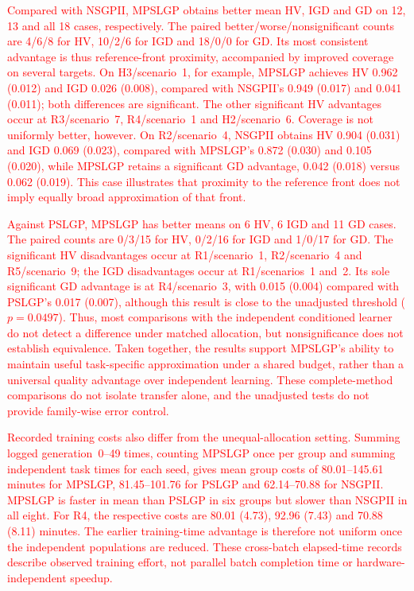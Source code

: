 \documentclass[10pt,journal]{IEEEtran}
\newcommand{\mm}[1]{\textcolor{red}{#1}}
\begin{document}
\mm{Compared with NSGPII, MPSLGP obtains better mean HV, IGD and GD on 12, 13 and all 18 cases, respectively. The paired better/worse/nonsignificant counts are 4/6/8 for HV, 10/2/6 for IGD and 18/0/0 for GD. Its most consistent advantage is thus reference-front proximity, accompanied by improved coverage on several targets. On H3/scenario~1, for example, MPSLGP achieves HV 0.962 (0.012) and IGD 0.026 (0.008), compared with NSGPII's 0.949 (0.017) and 0.041 (0.011); both differences are significant. The other significant HV advantages occur at R3/scenario~7, R4/scenario~1 and H2/scenario~6. Coverage is not uniformly better, however. On R2/scenario~4, NSGPII obtains HV 0.904 (0.031) and IGD 0.069 (0.023), compared with MPSLGP's 0.872 (0.030) and 0.105 (0.020), while MPSLGP retains a significant GD advantage, 0.042 (0.018) versus 0.062 (0.019). This case illustrates that proximity to the reference front does not imply equally broad approximation of that front.}

\mm{Against PSLGP, MPSLGP has better means on 6 HV, 6 IGD and 11 GD cases. The paired counts are 0/3/15 for HV, 0/2/16 for IGD and 1/0/17 for GD. The significant HV disadvantages occur at R1/scenario~1, R2/scenario~4 and R5/scenario~9; the IGD disadvantages occur at R1/scenarios~1 and~2. Its sole significant GD advantage is at R4/scenario~3, with 0.015 (0.004) compared with PSLGP's 0.017 (0.007), although this result is close to the unadjusted threshold ($p=0.0497$). Thus, most comparisons with the independent conditioned learner do not detect a difference under matched allocation, but nonsignificance does not establish equivalence. Taken together, the results support MPSLGP's ability to maintain useful task-specific approximation under a shared budget, rather than a universal quality advantage over independent learning. These complete-method comparisons do not isolate transfer alone, and the unadjusted tests do not provide family-wise error control.}

\mm{Recorded training costs also differ from the unequal-allocation setting. Summing logged generation~0--49 times, counting MPSLGP once per group and summing independent task times for each seed, gives mean group costs of 80.01--145.61 minutes for MPSLGP, 81.45--101.76 for PSLGP and 62.14--70.88 for NSGPII. MPSLGP is faster in mean than PSLGP in six groups but slower than NSGPII in all eight. For R4, the respective costs are 80.01 (4.73), 92.96 (7.43) and 70.88 (8.11) minutes. The earlier training-time advantage is therefore not uniform once the independent populations are reduced. These cross-batch elapsed-time records describe observed training effort, not parallel batch completion time or hardware-independent speedup.}
\end{document}
